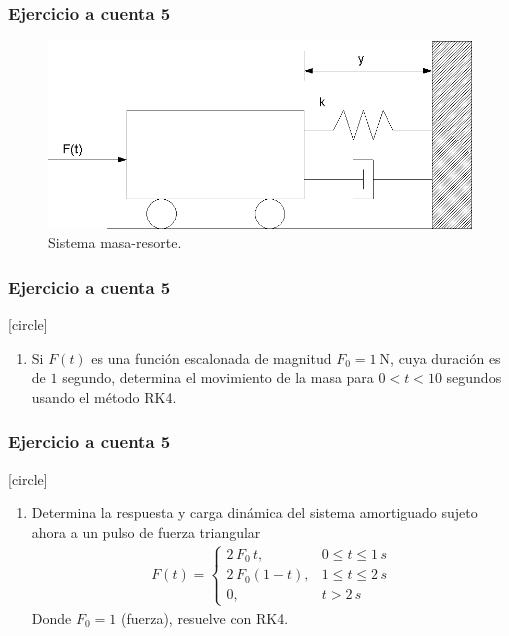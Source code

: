 \begin{frame}
\frametitle{Ejercicio a cuenta 5}
\begin{figure}[h!]
	\centering
	\includegraphics[scale=0.4]{Imagenes/Figura01.png}  
    \caption{Sistema masa-resorte.}
\end{figure}
\end{frame}
\begin{frame}
\frametitle{Ejercicio a cuenta 5}
[circle]
\begin{enumerate}[<+->]
\item Si $F(t)$ es una función escalonada de magnitud $F_{0} = \SI{1}{\newton}$, cuya duración es de $1$ segundo, determina el movimiento de la masa para $0 < t < 10$ segundos usando el método RK4.
\seti
\end{enumerate}
\end{frame}
\begin{frame}
\frametitle{Ejercicio a cuenta 5}
[circle]
\begin{enumerate}[<+->]
\conti
\item Determina la respuesta y carga dinámica del sistema amortiguado sujeto ahora a un pulso de fuerza triangular
\begin{align*}
F(t) =
\begin{cases}
2 \, F_{0} \, t,  & 0 \leq t \leq 1 \, s\\
2 \, F_{0} (1 - t), & 1 \leq t \leq 2 \, s\\
0, & t > 2 \, s
\end{cases}
\end{align*}
Donde $F_{0} = 1$ (fuerza), resuelve con RK4.
\end{enumerate}
\end{frame}
